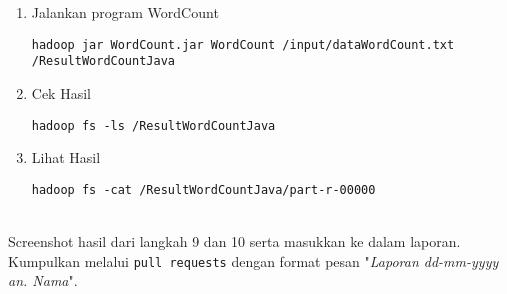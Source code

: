 \documentclass[a4paper]{tufte-handout}
\begin{document}
\begin{enumerate}
\item Jalankan program WordCount
\begin{lstlisting}[language=Terminal]
 hadoop jar WordCount.jar WordCount /input/dataWordCount.txt /ResultWordCountJava
\end{lstlisting}

\item Cek Hasil
\begin{lstlisting}[language=Terminal]
 hadoop fs -ls /ResultWordCountJava
\end{lstlisting}

\item Lihat Hasil
\begin{lstlisting}[language=Terminal]
 hadoop fs -cat /ResultWordCountJava/part-r-00000
\end{lstlisting} 
\end{enumerate}

 \\
Screenshot hasil dari langkah 9 dan 10 serta masukkan ke dalam laporan. Kumpulkan melalui {\tt pull requests} dengan format pesan "\textit{Laporan dd-mm-yyyy an. Nama}".

\hrulefill

\clearpage
\begin{comment}
\newday{\#12 - 22 Desember 2022 menggantikan 24 November 2022
\footnote{Mahasiswa yang hadir:
\begin{enumerate}
\item Adinda Awaliah
\item Adjie Yusmunandar
\item Arya Saputra
\item Cut Opy Mandalisa
\item Jihan Dwi Sarah
\item M. Ikhsan
\item Muhammad Munawir
\item Nadzura Kumaira
\item Nurani Harum Fardaniah
\item Nuraula Tafiza
\item Nurul Aflah
\item Rauzatinur Syah
\item Resha Russita
\item Rizki Ilhami
\item Salsabila Irmanda
\item Siti Hajar Al Zahra
\item Syarfani Akbar
\item Taravia Fauzah
\item Zulfahmi
\end{enumerate}}}
\end{comment}
\end{document}
